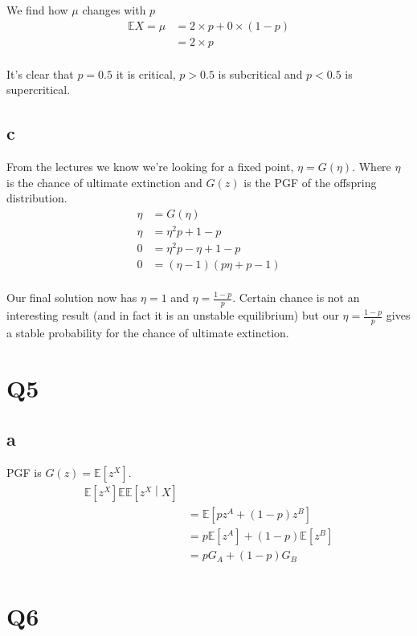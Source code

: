 \documentclass{article}
\newcommand{\expect}{\mathbb{E}}
\begin{document}
We find how $\mu$ changes with $p$
\begin{align*}
    \expect X = \mu &= 2 \times p + 0 \times (1 - p) \\
    &= 2 \times p \\
\end{align*}

It's clear that $p = 0.5$ it is critical, $p > 0.5$ is subcritical and
$p < 0.5$ is supercritical.

\subsection{c}
From the lectures we know we're looking for a fixed point,
$\eta = G(\eta)$. Where $\eta$ is
the chance of ultimate extinction and $G(z)$ is the PGF of the offspring
distribution.
\begin{align*}
    \eta &= G(\eta) \\
    \eta &= \eta^2 p + 1 - p \\
    0 &= \eta^2 p - \eta + 1 - p \\
    0 &= (\eta - 1)(p \eta + p - 1)  \\
\end{align*}

Our final solution now has $\eta = 1$ and $\eta = \frac{1-p}{p}$.
Certain chance is not an interesting result (and in fact it is an unstable
equilibrium) but our $\eta = \frac{1-p}{p}$ gives a stable probability
for the chance of ultimate extinction.

\section{Q5}
\subsection{a}
PGF is $G(z) = \expect \left[z^X\right]$.
\begin{align*}
    \expect \left[z^X\right]
    \expect \expect \left[z^X \middle| X \right] \\
    &= \expect \left[pz^A + (1-p)z^B\right] \\
    &= p \expect\left[z^A\right] + (1-p) \expect \left[z^B\right] \\
    &= p G_A + (1-p) G_B \\
\end{align*}

\section{Q6}
\end{document}
